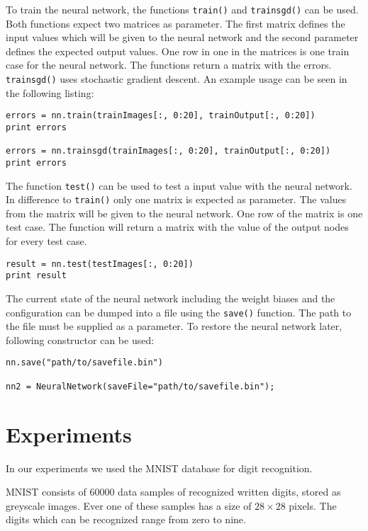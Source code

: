\documentclass{acm_proc_article-sp}
\begin{document}
To train the neural network, the functions \texttt{train()} and \texttt{trainsgd()} can be used. Both functions expect two matrices as parameter. The first matrix defines the input values which will be given to the neural network and the second parameter defines the expected output values. One row in one in the matrices is one train case for the neural network. The functions return a matrix with the errors. \texttt{trainsgd()} uses stochastic gradient descent. An example usage can be seen in the following listing:

\lstset{language=Python}
\begin{lstlisting}[caption=Usage of trainsgd() and train()]
errors = nn.train(trainImages[:, 0:20], trainOutput[:, 0:20])
print errors

errors = nn.trainsgd(trainImages[:, 0:20], trainOutput[:, 0:20])
print errors
\end{lstlisting}


The function \texttt{test()} can be used to test a input value with the neural network. In difference to \texttt{train()} only one matrix is expected as parameter. The values from the matrix will be given to the neural network. One row of the matrix is one test case. The function will return a matrix with the value of the output nodes for every test case.

\lstset{language=Python}
\begin{lstlisting}[caption=Usage of test()]
result = nn.test(testImages[:, 0:20])
print result
\end{lstlisting}


The current state of the neural network including the weight biases and the configuration can be dumped into a file using the \texttt{save()} function. The path to the file must be supplied as a parameter. To restore the neural network later, following constructor can be used:
\lstset{language=Python}
\begin{lstlisting}[caption=Constructor to load a dump file]
nn.save("path/to/savefile.bin")

nn2 = NeuralNetwork(saveFile="path/to/savefile.bin");
\end{lstlisting}


\section{Experiments}

In our experiments we used the MNIST database for digit recognition.

MNIST consists of 60000 data samples of recognized written digits, stored as greyscale images.
Ever one of these samples has a size of $28 \times 28$ pixels. The digits which can be recognized range from zero to nine.
\end{document}
